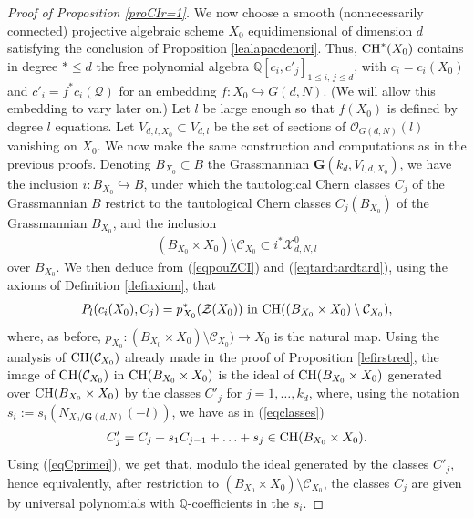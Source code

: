 \documentclass[10pt]{article}
\begin{document}
\begin{proof}[Proof of Proposition \ref{proCIr=1}]
 We now choose   a smooth (nonnecessarily connected) projective algebraic scheme $X_0$ equidimensional of dimension
 $d$ satisfying the conclusion of Proposition
  \ref{lealapacdenori}. Thus, ${\rm CH}^*(X_0)$ contains in degree $*\leq d$ the free polynomial algebra $\mathbb{Q}[c_i,c'_j]_{1\leq i,\,j\leq d}$,
with $c_i=c_i(X_0)$ and $c'_i=f^*c_i(\mathcal{Q})$ for an embedding
$f: X_0\hookrightarrow G(d,N)$.
 (We will allow this embedding to vary later on.)
Let $l$ be large enough so that $f(X_0)$ is defined by degree $l$ equations.
Let $V_{d,l, X_0}\subset V_{d,l}$ be the set of sections of $\mathcal{O}_{G(d,N)}(l)$ vanishing on $X_0$. We now make the same construction and computations  as in
the previous proofs.
Denoting $B_{X_0}\subset B$ the Grassmannian
$\mathbf{G}(k_d,V_{l,d,X_0})$, we  have the inclusion $i:B_{X_0}\hookrightarrow  B$, under which the tautological Chern  classes
$C_j$ of the Grassmannian $B$ restrict to the tautological Chern classes $C_j(B_{X_0})$ of the Grassmannian
$B_{X_0}$,
 and the inclusion
\begin{eqnarray}\label{eqinclusionetalee}( B_{X_0}\times X_0)\setminus \mathcal{C}_{X_0}\subset i^*\mathcal{X}^0_{d,N,l}
\end{eqnarray}
 over
$B_{X_0}$.
We then deduce from (\ref{eqpouZCI}) and (\ref{eqtardtardtard}), using the axioms of Definition \ref{defiaxiom}, that
\begin{eqnarray}\label{eqpullbackaxzero}
P_l(c_i(X_0), C_j)=p_{X_0}^*(\mathcal{Z}({X_0}))\,\,{\rm  in }\,\,{\rm CH}((B_{X_0}\times X_0)\setminus \mathcal{C}_{X_0}),
\end{eqnarray}
 where, as before, $p_{X_0}: (B_{X_0}\times X_0)\setminus \mathcal{C}_{X_0})\rightarrow X_0$ is the natural map. Using the analysis of ${\rm CH}(\mathcal{C}_{X_0})$
already made in the proof of Proposition \ref{lefirstred}, the image
of  ${\rm CH}(\mathcal{C}_{X_0})$ in ${\rm CH}(B_{X_0}\times X_0 )$ is the ideal of
${\rm CH}(B_{X_0}\times X_0)$ generated over ${\rm CH}( B_{X_0}\times X_0)$
by the classes
$C'_j$ for $j=1,\ldots, k_d$, where, using  the notation
$s_i:=s_i(N_{X_0/\mathbf{G}(d,N)}(-l))$, we have as in (\ref{eqclasses})
\begin{eqnarray}\label{eqCprimei}  C'_j=C_j+s_1C_{j-1}+\ldots + s_{j}\in {\rm CH}( B_{X_0}\times X_0).
\end{eqnarray}
Using (\ref{eqCprimei}), we  get that, modulo the ideal generated by the classes $C'_j$, hence equivalently, after restriction to
$(B_{X_0}\times X_0)\setminus \mathcal{C}_{X_0}$, the classes
$C_j$  are given by universal polynomials with
$\mathbb{Q}$-coefficients in the $s_i$.


\end{proof}
\end{document}
